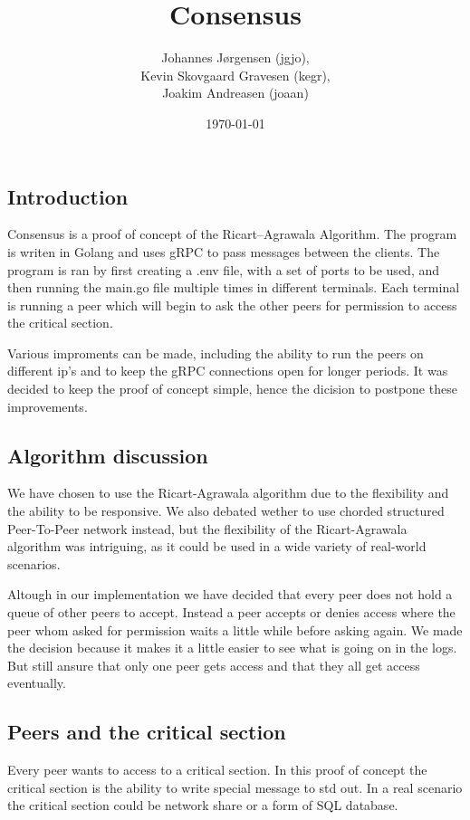 \documentclass[a4paper,11pt]{article}
\title{Consensus}
\author{Johannes Jørgensen (jgjo),\\ Kevin Skovgaard Gravesen (kegr),\\ Joakim Andreasen (joaan)}
\date{\today}
\begin{document}
 

\maketitle

\subsection*{Introduction}
Consensus is a proof of concept of the Ricart–Agrawala Algorithm. The program is writen in Golang and uses gRPC to pass messages between the clients.
The program is ran by first creating a .env file, with a set of ports to be used, and then running the main.go file multiple times in different terminals.
Each terminal is running a peer which will begin to ask the other peers for permission to access the critical section.

Various improments can be made, including the ability to run the peers on different ip's and to keep the gRPC connections open for longer periods.
It was decided to keep the proof of concept simple, hence the dicision to postpone these improvements.

\subsection*{Algorithm discussion}
We have chosen to use the Ricart-Agrawala algorithm due to the flexibility and the ability to be responsive. We also debated wether to use chorded structured Peer-To-Peer
network instead, but the flexibility of the Ricart-Agrawala algorithm was intriguing, as it could be used in a wide variety of real-world scenarios.

Altough in our implementation we have decided that every peer does not hold a queue of other peers to accept. Instead a peer accepts or denies access where the peer whom asked for permission waits a little while before asking again.
We made the decision because it makes it a little easier to see what is going on in the logs. But still ansure that only one peer gets access and that they all get access eventually.

\subsection*{Peers and the critical section}
Every peer wants to access to a critical section. In this proof of concept the critical section is the ability to write special message to std out.
In a real scenario the critical section could be network share or a form of SQL database.
\end{document}
